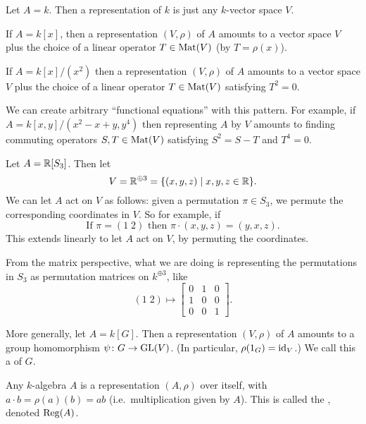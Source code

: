 \begin{example}
	\listhack
	\begin{enumerate}[(a)]
		\ii Let $A = k$.
		Then a representation of $k$ is just any $k$-vector space $V$.

		\ii If $A = k[x]$,
		then a representation $(V, \rho)$ of $A$
		amounts to a vector space $V$ plus the choice of
		a linear operator $T \in \mathrm{Mat}(V)$ (by $T = \rho(x)$).

		\ii If $A = k[x] / (x^2)$
		then a representation $(V, \rho)$ of $A$
		amounts to a vector space $V$ plus the choice of
		a linear operator $T \in \mathrm{Mat}(V)$ satisfying $T^2 = 0$.

		\ii We can create arbitrary ``functional equations'' with this pattern.
		For example, if $A = k[x,y] / (x^2 - x+y, y^4)$
		then representing $A$ by $V$ amounts to finding commuting operators
		$S, T \in \mathrm{Mat}(V)$ satisfying $S^2 = S-T$ and $T^4 = 0$.
	\end{enumerate}
\end{example}

\begin{example}
	\listhack
	\begin{enumerate}[(a)]
		\ii Let $A = \mathbb R[S_3]$.
		Then let
		\[ V = \mathbb R^{\oplus 3} = \{ (x,y,z) \mid x,y,z \in \mathbb R \}. \]
		We can let $A$ act on $V$ as follows:
		given a permutation $\pi \in S_3$, we permute the corresponding
		coordinates in $V$.
		So for example, if
		\[ \text{If } \pi = (1 \; 2)
		\text{ then } \pi \cdot (x,y,z) = (y,x,z). \]
		This extends linearly to let $A$ act on $V$,
		by permuting the coordinates.

		From the matrix perspective, what we are doing
		is representing the permutations in $S_3$
		as permutation matrices on $k^{\oplus 3}$, like
		\[ (1 \; 2)
		\mapsto \begin{bmatrix} 0&1&0 \\ 1&0&0 \\ 0&0&1 \end{bmatrix}. \]

		\ii More generally, let $A = k[G]$.
		Then a representation $(V, \rho)$ of $A$
		amounts to a group homomorphism $\psi \colon G \to \operatorname{GL}(V)$.
		(In particular, $\rho(1_G) = \mathrm{id}_V$.)
		We call this a  of $G$.
	\end{enumerate}
\end{example}
\begin{example}
	Any $k$-algebra $A$ is a representation $(A, \rho)$ over itself,
	with $a \cdot b = \rho(a)(b) = ab$ (i.e.\ multiplication given by $A$).
	This is called the , denoted $\operatorname{Reg}(A)$.
\end{example}

